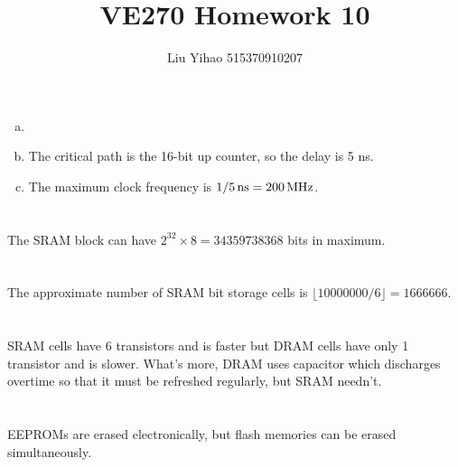 \documentclass{article}
\title{VE270 Homework 10}
\author{Liu Yihao 515370910207}
\date{}
\newcommand{\unit}[1]{{\rm\,#1}}
\begin{document}
\maketitle

\section{}
\begin{enumerate}[(a)]
\item
%
\item
The critical path is the 16-bit up counter, so the delay is 5 ns.
\item
The maximum clock frequency is $1/5\unit{ns}=200\unit{MHz}$.
\end{enumerate}

\section{}
The SRAM block can have $2^{32}\times8=34359738368$ bits in maximum.

\section{}
The approximate number of SRAM bit storage cells is $\lfloor 10000000/6 \rfloor=1666666$.

\section{}
SRAM cells have 6 transistors and is faster but DRAM cells have only 1 transistor and is slower. What's more, DRAM uses capacitor which discharges overtime so that it must be refreshed regularly, but SRAM needn't.

\section{}
EEPROMs are erased electronically, but flash memories can be erased simultaneously.
\end{document}
